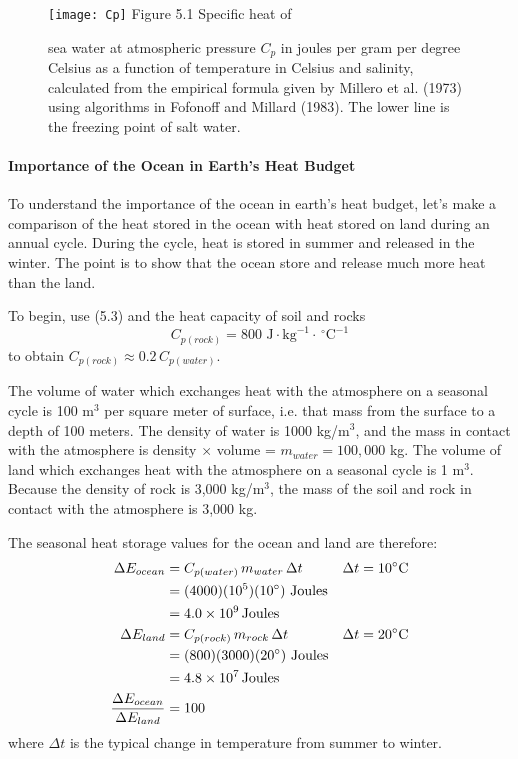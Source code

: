 \begin{figure}[t!]
\texttt{[image: Cp]}
\footnotesize Figure 5.1 Specific heat of \rule{0pt}{3ex}sea water at
atmospheric pressure
$C_{p}$ in joules per gram per degree Celsius as a function of temperature in
Celsius and salinity, calculated from the empirical formula given by Millero
et al. (1973) using algorithms in Fofonoff and Millard (1983). The
lower line is the freezing point of salt water.
\label{fig:Cp}
\vspace{-3ex}
\end{figure}

\paragraph{Importance of the Ocean in Earth's Heat Budget}
To understand the importance of
the ocean in earth's heat budget, let's make a comparison
of the heat stored in the ocean with heat stored on land during an
annual cycle. During the cycle, heat is stored in summer and
released in the winter. The point is to show that the ocean store
and release much more heat than the land.

To begin, use (5.3) and the heat capacity of soil and rocks
\begin{equation}
C_{p(rock)} = 800 \mbox{ J}\cdot \mbox{kg}^{-1} \cdot \, ^\circ \mbox{C}^{-1}
\end{equation}
to obtain $C_{p(rock)} \approx 0.2 \, C_{p(water)}$.

The volume of water which exchanges heat with the atmosphere on a seasonal cycle
is 100 m$^3$ per square meter of surface, i.e. that mass from the surface to a
depth of 100 meters. The density of water is 1000 kg/m$^3$, and the mass in
contact with the atmosphere is density $\times$ volume = $m_{water} = 100,000$
kg. The volume of land which exchanges heat with the atmosphere on a seasonal
cycle is 1 m$^3$. Because the density of rock is 3,000 kg/m$^3$, the mass of the
soil and rock in contact with the atmosphere is 3,000 kg.

The seasonal heat storage values for the ocean and land are
therefore:
\begin{align}
\Delta E_{ocean} & = C_{p(water)} \, m_{water}\, \Delta t && \Delta t =
10^{\circ} \text{C} \notag \\
                                     & = (4000) (10^5) (10^{\circ}) \text{
Joules}       \notag  \\
                                     & = 4.0 \times 10^9 \, \text{Joules}                 \notag  \\
\Delta E_{land}   & = C_{p(rock)} \, m_{rock}\, \Delta t & & \Delta t = 20^{\circ
} \text{C} \notag \\
                                     & = (800) (3000) (20^{\circ}) \text{
Joules}        \notag  \\
                                     & = 4.8 \times 10^7 \, \text{Joules}               \notag  \\
\frac{\Delta E_{ocean}}{\Delta E_{land}}  & = 100 \notag
\end{align}
where $\Delta t$ is the typical change in temperature from summer to winter.


